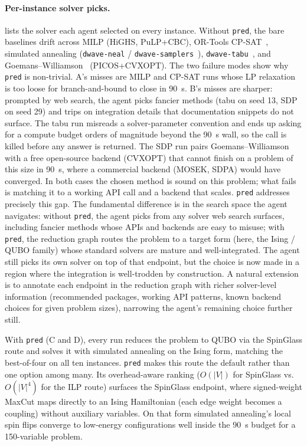 \documentclass{article}
\begin{document}
\paragraph{Per-instance solver picks.}
 lists the solver each agent selected on every instance.
Without \texttt{pred}, the bare baselines drift across MILP (HiGHS, PuLP+CBC), OR-Tools CP-SAT~\cite{Perron2024ORTools}, simulated annealing (\texttt{dwave-neal} / \texttt{dwave-samplers}~\cite{DWaveOcean2026}), \texttt{dwave-tabu}~\cite{DWaveOcean2026}, and Goemans--Williamson~\cite{GoemansWilliamson1995} (PICOS+CVXOPT). The two failure modes show why \texttt{pred} is non-trivial. A's misses are MILP and CP-SAT runs whose LP relaxation is too loose for branch-and-bound to close in 90~s. B's misses are sharper: prompted by web search, the agent picks fancier methods (tabu on seed 13, SDP on seed 29) and trips on integration details that documentation snippets do not surface. The tabu run misreads a solver-parameter convention and ends up asking for a compute budget orders of magnitude beyond the 90~s wall, so the call is killed before any answer is returned. The SDP run pairs Goemans--Williamson with a free open-source backend (CVXOPT) that cannot finish on a problem of this size in 90~s, where a commercial backend (MOSEK, SDPA) would have converged. In both cases the chosen method is sound on this problem; what fails is matching it to a working API call and a backend that scales. \texttt{pred} addresses precisely this gap. The fundamental difference is in the search space the agent navigates: without \texttt{pred}, the agent picks from any solver web search surfaces, including fancier methods whose APIs and backends are easy to misuse; with \texttt{pred}, the reduction graph routes the problem to a target form (here, the Ising / QUBO family) whose standard solvers are mature and well-integrated. The agent still picks its own solver on top of that endpoint, but the choice is now made in a region where the integration is well-trodden by construction. A natural extension is to annotate each endpoint in the reduction graph with richer solver-level information (recommended packages, working API patterns, known backend choices for given problem sizes), narrowing the agent's remaining choice further still.

With \texttt{pred} (C and D), every run reduces the problem to QUBO via the SpinGlass route and solves it with simulated annealing on the Ising form, matching the best-of-four on all ten instances. \texttt{pred} makes this route the default rather than one option among many. Its overhead-aware ranking ($O(|V|)$ for SpinGlass vs.\ $O(|V|^4)$ for the ILP route) surfaces the SpinGlass endpoint, where signed-weight MaxCut maps directly to an Ising Hamiltonian (each edge weight becomes a coupling) without auxiliary variables. On that form simulated annealing's local spin flips converge to low-energy configurations well inside the 90~s budget for a 150-variable problem. 
\end{document}

